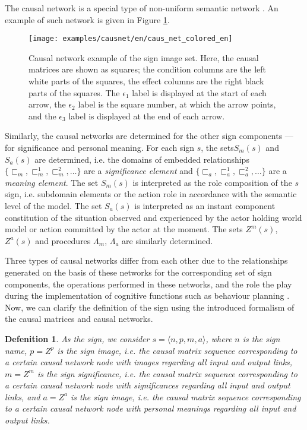 \documentclass[12pt]{scrartcl}
\newtheorem{definition}{Defenition}
\begin{document}
	The causal network is a special type of non-uniform semantic network \cite{Osipov1990}. An example of such network is given in Figure \ref{fig:caus_net}.

	\begin{figure}[h]
		\centering
		\texttt{[image: examples/causnet/en/caus\_net\_colored\_en]}
		\caption{Causal network example of the sign image set. Here, the causal matrices are shown as squares; the condition columns are the left white parts of the squares, the effect columns are the right black parts of the squares. The $\epsilon_1$ label is displayed at the start of each arrow, the $\epsilon_2$ label is the square number, at which the arrow points, and the $\epsilon_3$ label is displayed at the end of each arrow.}
		\label{fig:caus_net}		
	\end{figure}
		
	Similarly, the causal networks are determined for the other sign components --- for significance and personal meaning. For each sign $s$, the sets$S_m(s)$ and $S_a(s)$ are determined, i.e. the domains of embedded relationships $\{\sqsubset_m,\sqsubset_m^1,\sqsubset_m^2,\dots\}$ are a \textit{significance element} and $\{\sqsubset_a,\sqsubset_a^1,\sqsubset_a^2,\dots\}$ are a \textit{meaning element}. The set $S_m(s)$ is interpreted as the role composition of the $s$ sign, i.e. subdomain elements or the action role in accordance with the semantic level of the model. The set $S_a(s)$ is interpreted as an instant component constitution of the situation observed and experienced by the actor holding world model or action committed by the actor at the moment. The sets $Z^m(s)$, $Z^a(s)$ and procedures $\Lambda_m$, $\Lambda_a$ are similarly determined.
	
	Three types of causal networks differ from each other due to the relationships generated on the basis of these networks for the corresponding set of sign components, the operations performed in these networks, and the role the play during the implementation of cognitive functions such as behaviour planning \cite{Osipov2015d,Panov2017a}. Now, we can clarify the definition of the sign \cite{Osipov2015c} using the introduced formalism of the causal matrices and causal networks.
	
	\begin{definition}
		As the sign, we consider $s=\langle n, p, m, a \rangle$, where $n$ is the sign name, $p=Z^p$ is the sign image, i.e. the causal matrix sequence corresponding to a certain causal network node with images regarding all input and output links, $m=Z^m$ is the sign significance, i.e. the causal matrix sequence corresponding to a certain causal network node with significances regarding all input and output links, and $a=Z^a$ is the sign image, i.e. the causal matrix sequence corresponding to a certain causal network node with personal meanings regarding all input and output links.
	\end{definition}
	
\end{document}
